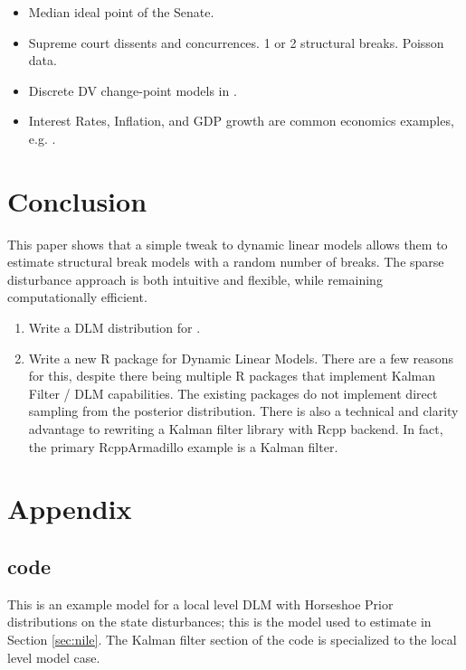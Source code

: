 \documentclass{article}
\begin{document}
\begin{itemize}
\item Median ideal point of the Senate. \parencites{RatkovicEng2010}
\item Supreme court dissents and concurrences. 1 or 2 structural breaks. Poisson data. \parencite{CalderiaZorn1998}
\item Discrete DV change-point models in \parencite{Spirling2007b}.
\item Interest Rates, Inflation, and GDP growth are common economics examples, e.g. \textcite{GiordaniKohn2008}.
\end{itemize}

\section{Conclusion}
\label{sec:conclusion}

This paper shows that a simple tweak to dynamic linear models allows them to estimate structural break models with a random number of breaks.
The sparse disturbance approach is both intuitive and flexible, while remaining computationally efficient.

\begin{enumerate}
\item Write a DLM distribution for \Stan{}.
\item Write a new R package for Dynamic Linear Models. There are a few reasons for this, despite there being multiple R packages that implement Kalman Filter / DLM capabilities. 
The existing packages do not implement direct sampling from the posterior distribution. 
There is also a technical and clarity advantage to rewriting a Kalman filter library with Rcpp backend. In fact, the primary RcppArmadillo example is 
a Kalman filter.
\end{enumerate}

\clearpage{}

\printbibliography{}

\section{Appendix}
\label{sec:appendix
}
\subsection{code}
\label{sec:code}

This is an example \Stan{} model for a local level DLM with Horseshoe Prior distributions on the state disturbances; this is the \Stan{} model used to estimate  in Section \ref{sec:nile}. 
The Kalman filter section of the \Stan{} code is specialized to the local level model case.

\begin{singlespace}
    
\end{singlespace}
\end{document}
